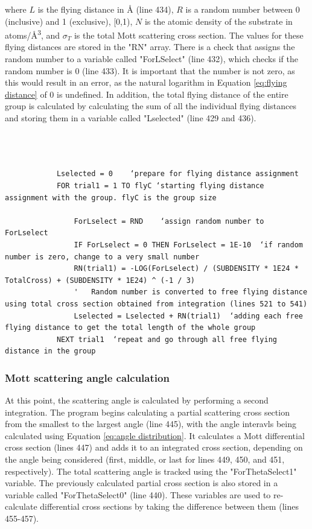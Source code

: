 \documentclass[10pt, reqno]{exam}
\begin{document}
where $L$ is the flying distance in \si{\angstrom} (line 434), $R$ is a random number between 0 (inclusive) and 1 (exclusive), [0,1), $N$ is the atomic density of the substrate in \si{atoms/\angstrom^3}, and $\sigma_T$ is the total Mott scattering cross section. The values for these flying distances are stored in the "RN" array. There is a check that assigns the random number to a variable called "ForLSelect" (line 432), which checks if the random number is 0 (line 433). It is important that the number is not zero, as this would result in an error, as the natural logarithm in Equation \ref{eq:flying distance} of 0 is undefined. In addition, the total flying distance of the entire group is calculated by calculating the sum of all the individual flying distances and storing them in a variable called "Lselected" (line 429 and 436). \par

\begin{verbatim}
    
    
    
            Lselected = 0    ‘prepare for flying distance assignment
            FOR trial1 = 1 TO flyC ‘starting flying distance assignment with the group. flyC is the group size
    
                ForLselect = RND    ‘assign random number to ForLselect
                IF ForLselect = 0 THEN ForLselect = 1E-10  ‘if random number is zero, change to a very small number
                RN(trial1) = -LOG(ForLselect) / (SUBDENSITY * 1E24 * TotalCross) + (SUBDENSITY * 1E24) ^ (-1 / 3)
                '   Random number is converted to free flying distance using total cross section obtained from integration (lines 521 to 541)
                Lselected = Lselected + RN(trial1)  ‘adding each free flying distance to get the total length of the whole group
            NEXT trial1  ‘repeat and go through all free flying distance in the group
\end{verbatim}

\subsubsection{Mott scattering angle calculation}

At this point, the scattering angle is calculated by performing a second integration. The program begins calculating a partial scattering cross section from the smallest to the largest angle (line 445), with the angle interavls being calculated using Equation \ref{eq:angle distribution}. It calculates a Mott differential cross section (lines 447) and adds it to an integrated cross section, depending on the angle being considered (first, middle, or last for lines 449, 450, and 451, respectively). The total scattering angle is tracked using the "ForThetaSelect1" variable. The previously calculated partial cross section is also stored in a variable called "ForThetaSelect0" (line 440). These variables are used to re-calculate differential cross sections by taking the difference between them (lines 455-457). \par
\end{document}
